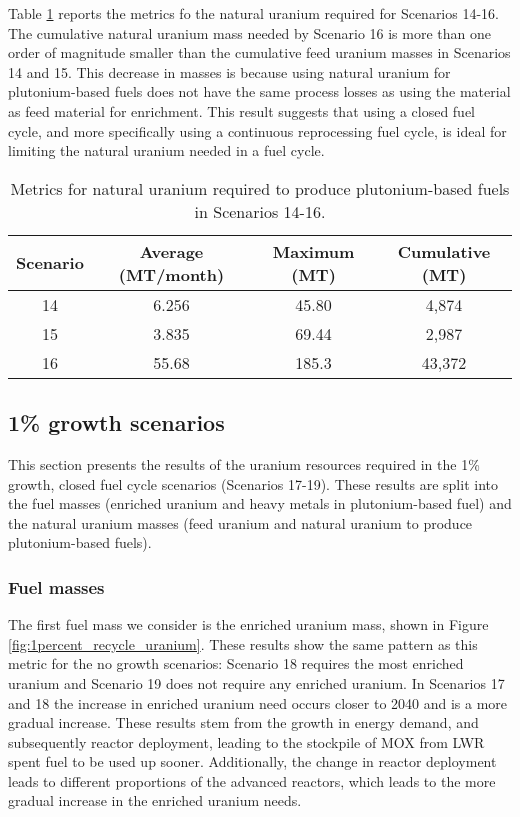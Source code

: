 Table \ref{tab:s14-16_natU} reports the metrics fo the natural uranium 
required for Scenarios 14-16. The cumulative natural uranium mass 
needed by Scenario 16 is more than one order of magnitude smaller than 
the cumulative feed uranium masses in Scenarios 14 and 15. This 
decrease in masses is because using natural uranium for plutonium-based 
fuels does not have the same process losses as using the 
material as feed material for enrichment. This result suggests that 
using a closed fuel cycle, and more specifically using a continuous 
reprocessing fuel cycle, is ideal for limiting the natural uranium 
needed in a fuel cycle. 

\begin{table}[h!]
    \centering 
    \caption{Metrics for natural uranium required to produce 
    plutonium-based fuels in Scenarios 14-16.}
    \label{tab:s14-16_natU}
    \begin{tabular}{c c c c}
        \hline 
        Scenario & Average (MT/month) & Maximum (MT) & Cumulative (MT) \\
        \hline 
        14 & 6.256 & 45.80 & 4,874 \\
        15 & 3.835 & 69.44 & 2,987 \\
        16 & 55.68 & 185.3 & 43,372 \\
        \hline
        
    \end{tabular}
\end{table}

\subsection{1\% growth scenarios}
This section presents the results of the uranium resources required 
in the 1\% growth, closed fuel cycle scenarios (Scenarios 17-19). 
These results are split into the fuel masses (enriched uranium 
and heavy metals in plutonium-based fuel) and the natural 
uranium masses (feed uranium and natural uranium to produce 
plutonium-based fuels).

\subsubsection{Fuel masses}
The first fuel mass we consider is the enriched uranium mass, 
shown in Figure \ref{fig:1percent_recycle_uranium}. These results 
show the same pattern as this metric for the no growth scenarios:
Scenario 18 requires the most enriched uranium and Scenario 19 
does not require any enriched uranium. In Scenarios 17 and 18 the 
increase in enriched uranium need occurs closer to 2040 and is a 
more gradual increase. These results stem from the growth in energy 
demand, and subsequently reactor deployment, leading to the stockpile 
of \gls{MOX} from \gls{LWR} spent fuel to be used up sooner. 
Additionally, the change in reactor deployment leads to different 
proportions of the advanced reactors, which leads to the more gradual 
increase in the enriched uranium needs.

